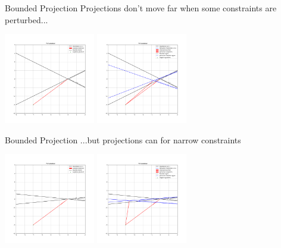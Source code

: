 \documentclass{beamer}
\begin{document}
\begin{frame}{Bounded Projection}
	Projections don't move far when some constraints are perturbed...
	\begin{center}
		\includegraphics[width=150px]{images/hoffman_0.png}
		\includegraphics[width=150px]{images/hoffman_1.png}
	\end{center}
\end{frame}


\begin{frame}{Bounded Projection}
	...but projections can for narrow constraints
	\begin{center}
		\includegraphics[width=150px]{images/hoffman_2.png}
		\includegraphics[width=150px]{images/hoffman_3.png}
	\end{center}
\end{frame}
\end{document}
